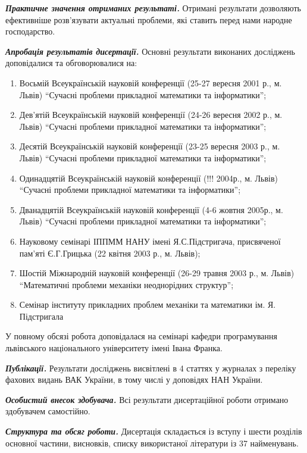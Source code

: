 \emph{\textbf{Практичне значення отриманих результаті.}}\textbf{
}Отримані результати дозволяють ефективніше розв'язувати актуальні
проблеми, які ставить перед нами народне господарство.

\emph{\textbf{Апробація результатів дисертації.}} Основні результати
виконаних досліджень доповідалися та обговорювалися на:

\begin{enumerate}
\def\labelenumi{\arabic{enumi}.}
\tightlist
\item
  Восьмій Всеукраїнській науковій конференції (25-27 вересня 2001 р., м.
  Львів) ``Сучасні проблеми прикладної математики та інформатики'';
\item
  Дев'ятій Всеукраїнській науковій конференції (24-26 вересня 2002 р.,
  м. Львів) ``Сучасні проблеми прикладної математики та інформатики'';
\item
  Десятій Всеукраїнській науковій конференції (23-25 вересня 2003 р., м.
  Львів) ``Сучасні проблеми прикладної математики та інформатики'';
\item
  Одинадцятій Всеукраїнській науковій конференції (!!! 2004р., м. Львів)
  ``Сучасні проблеми прикладної математики та інформатики'';
\item
  Дванадцятій Всеукраїнській науковій конференції (4-6 жовтня 2005р., м.
  Львів) ``Сучасні проблеми прикладної математики та інформатики'';
\item
  Науковому семінарі ІППММ НАНУ імені Я.С.Підстригача, присвяченої
  пам'яті Є.Г.Грицька (22 квітня 2003 р., м. Львів);
\item
  Шостій Міжнародній науковій конференції (26-29 травня 2003 р., м.
  Львів) ``Математичні проблеми механіки неоднорідних структур'';
\item
  Семінар інституту прикладних проблем механіки та математики ім. Я.
  Підстригала
\end{enumerate}

У повному обсязі робота доповідалася на семінарі кафедри програмування
львівського національного університету імені Івана Франка.

\emph{\textbf{Публікації.}} Результати досліджень висвітлені в 4 статтях
у журналах з переліку фахових видань ВАК України, в тому числі у
доповідях НАН України.

\emph{\textbf{Особистий внесок здобувача.}} Всі результати дисертаційної
роботи отримано здобувачем самостійно.

\emph{\textbf{Структура та обсяг роботи. }}Дисертація складається із
вступу і шести розділів основної частини, висновків, списку використаної
літератури із 37 найменувань.

